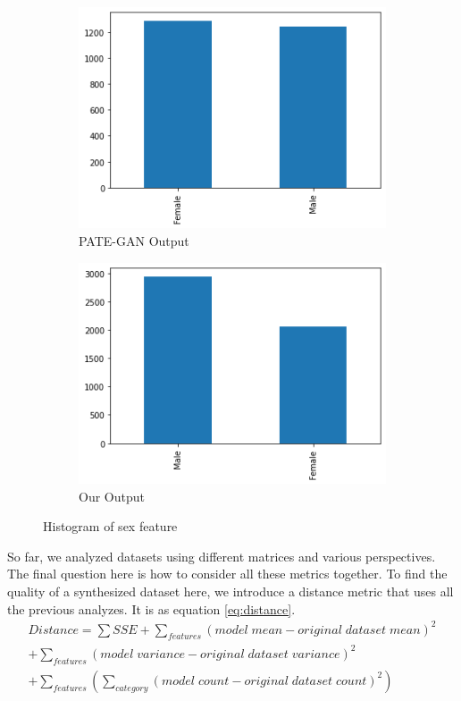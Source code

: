 \documentclass{article}
\begin{document}
\begin{figure}
\begin{subfigure}[b]{0.24\textwidth}
        \includegraphics[width=\textwidth]{images/pategan_hist_sex.png}
        \caption{PATE-GAN Output}
        \label{fig:histogram_pategan}
    \end{subfigure}
    \hfill
     \begin{subfigure}[b]{0.24\textwidth}
         \centering
         \includegraphics[width=\textwidth]{images/teacehr_hist_sex.png}
         \caption{Our Output}
         \label{fig:histogram_teacher}
     \end{subfigure}
        \caption{Histogram of sex feature}
        \label{fig:histogram}
\end{figure}

So far, we analyzed datasets using different matrices and various perspectives. The final question here is how to consider all these metrics together. To find the quality of a synthesized dataset here, we introduce a distance metric that uses all the previous analyzes. It is as equation \ref{eq:distance}.
\begin{multline}
Distance = \sum SSE + \sum_{features}(model\;mean - original\;dataset\;mean)^2 \\
+ \sum_{features}(model\;variance - original\;dataset\;variance)^2 \\
+ \sum_{features}(\sum_{category}(model\;count - original\;dataset\;count)^2)
\label{eq:distance}
\end{multline}
\end{document}
